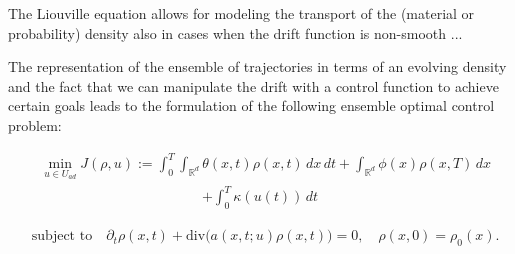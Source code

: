 \documentclass{article}
\begin{document}
The Liouville equation allows for modeling the transport of the (material or probability) density also in cases when the drift function is non-smooth ...

The representation of the ensemble of trajectories in terms of an evolving density and the fact that we can manipulate the drift with a control function to achieve certain goals leads to the formulation of the following ensemble optimal control problem:

\begin{align}
    & \min_{u \in U_{ad}} J(\rho, u) := \int_{0}^{T} \int_{\mathbb{R}^d} \theta(x, t) \rho(x, t) \, dx \, dt + \int_{\mathbb{R}^d} \phi(x) \rho(x, T) \, dx\nonumber
\end{align}
\begin{align}
    + \int_{0}^{T} \kappa(u(t)) \, dt \tag{2.3} \nonumber
\end{align}

\begin{align}
    & \text{subject to} \quad \partial_t \rho(x, t) + \text{div}\big( a(x, t; u) \rho(x, t) \big) = 0, \quad \rho(x, 0) = \rho_0(x). \tag{2.4} \nonumber
\end{align}
\end{document}
